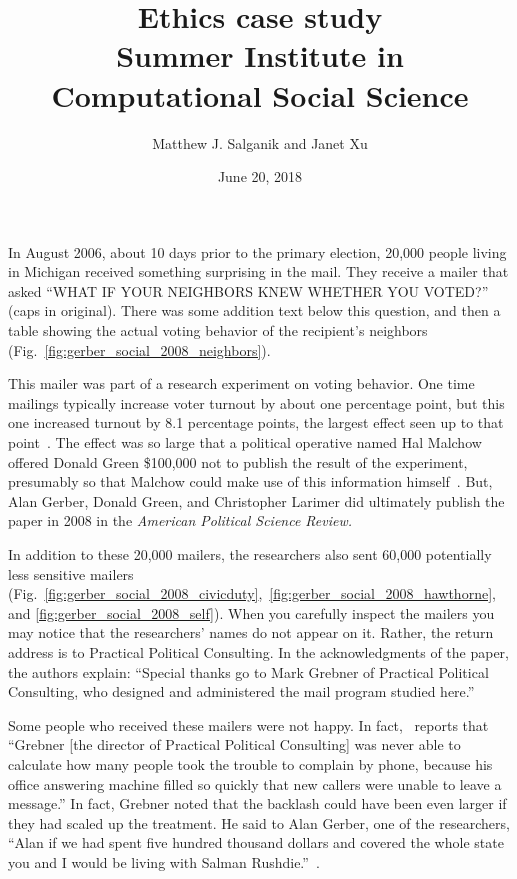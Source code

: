 \documentclass{article}
\title{Ethics case study\\Summer Institute in Computational Social Science\footnotemark[1]}
\author{Matthew J. Salganik and Janet Xu}
\date{June 20, 2018}
\begin{document}
\maketitle
\renewcommand{\thefootnote}{\fnsymbol{footnote}}
\thispagestyle{empty}
\renewcommand{\thefootnote}{\arabic{footnote}}

In August 2006, about 10 days prior to the primary election, 20,000 people living in Michigan received something surprising in the mail.  They receive a mailer that asked ``WHAT IF YOUR NEIGHBORS KNEW WHETHER YOU VOTED?'' (caps in original).  There was some addition text below this question, and then a table showing the actual voting behavior of the recipient's neighbors (Fig.~\ref{fig:gerber_social_2008_neighbors}). 

This mailer was part of a research experiment on voting behavior.  One time mailings typically increase voter turnout by about one percentage point, but this one increased turnout by 8.1 percentage points, the largest effect seen up to that point~\citep{gerber_social_2008}.  The effect was so large that a political operative named Hal Malchow offered Donald Green \$100,000 not to publish the result of the experiment, presumably so that Malchow could make use of this information himself~\citep[p. 304]{issenberg_victory_2012}.  But, Alan Gerber, Donald Green, and Christopher Larimer did ultimately publish the paper in 2008 in the \textit{American Political Science Review.}  
 
In addition to these 20,000 mailers, the researchers also sent 60,000 potentially less sensitive mailers (Fig.~\ref{fig:gerber_social_2008_civicduty},~\ref{fig:gerber_social_2008_hawthorne}, and \ref{fig:gerber_social_2008_self}).  When you carefully inspect the mailers you may notice that the researchers' names do not appear on it.  Rather, the return address is to Practical Political Consulting.  In the acknowledgments of the paper, the authors explain: ``Special thanks go to Mark Grebner of Practical Political Consulting, who designed and administered the mail program studied here.''
 
Some people who received these mailers were not happy.  In fact,~\citet[p. 198]{issenberg_victory_2012} reports that ``Grebner [the director of Practical Political Consulting] was never able to calculate how many people took the trouble to complain by phone, because his office answering machine filled so quickly that new callers were unable to leave a message.'' In fact, Grebner noted that the backlash could have been even larger if they had scaled up the treatment.  He said to Alan Gerber, one of the researchers, ``Alan if we had spent five hundred thousand dollars and covered the whole state you and I would be living with Salman Rushdie.''~\citep[p. 200]{issenberg_victory_2012}.
 
\end{document}
